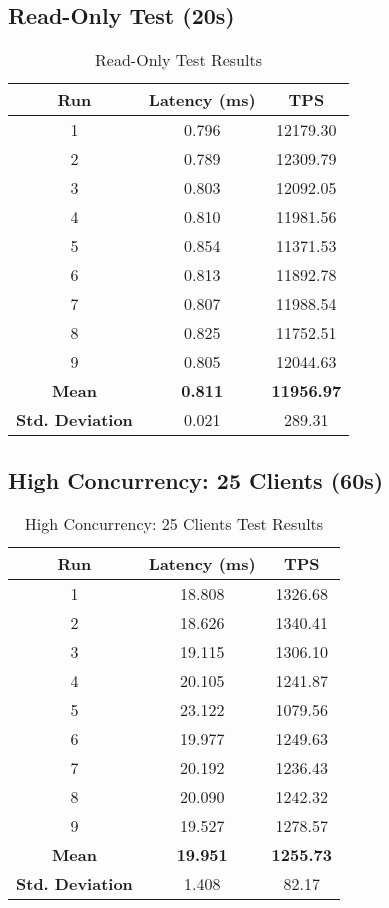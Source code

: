 \subsection{Read-Only Test (20s)}
\begin{table}[H]
\centering
\begin{tabular}{|c|c|c|}
\hline
\textbf{Run} & \textbf{Latency (ms)} & \textbf{TPS} \\
\hline
1 & 0.796 & 12179.30 \\
2 & 0.789 & 12309.79 \\
3 & 0.803 & 12092.05 \\
4 & 0.810 & 11981.56 \\
5 & 0.854 & 11371.53 \\
6 & 0.813 & 11892.78 \\
7 & 0.807 & 11988.54 \\
8 & 0.825 & 11752.51 \\
9 & 0.805 & 12044.63 \\
\hline
\textbf{Mean} & \textbf{0.811} & \textbf{11956.97} \\
\textbf{Std. Deviation} & 0.021 & 289.31 \\
\hline
\end{tabular}
\caption{Read-Only Test Results}
\end{table}

\subsection{High Concurrency: 25 Clients (60s)}
\begin{table}[H]
\centering
\begin{tabular}{|c|c|c|}
\hline
\textbf{Run} & \textbf{Latency (ms)} & \textbf{TPS} \\
\hline
1 & 18.808 & 1326.68 \\
2 & 18.626 & 1340.41 \\
3 & 19.115 & 1306.10 \\
4 & 20.105 & 1241.87 \\
5 & 23.122 & 1079.56 \\
6 & 19.977 & 1249.63 \\
7 & 20.192 & 1236.43 \\
8 & 20.090 & 1242.32 \\
9 & 19.527 & 1278.57 \\
\hline
\textbf{Mean} & \textbf{19.951} & \textbf{1255.73} \\
\textbf{Std. Deviation} & 1.408 & 82.17 \\
\hline
\end{tabular}
\caption{High Concurrency: 25 Clients Test Results}
\end{table}

